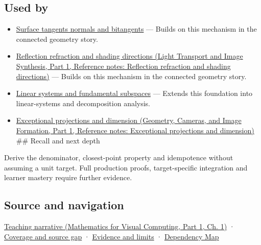 \subsection{Used by}\label{appendix-505a502c372a-used-by}

\hypertarget{appendix-505a502c372a-used-by}{}

\begin{itemize}
\item
  \hyperref[appendix-e31893dec985]{Surface tangents normals and bitangents} --- Builds on this mechanism in the connected geometry story.
\item
  \href{../04-Light-Transport-and-Image-Synthesis-P01/main.pdf\#nameddest=appendix-44e00863b4d5}{Reflection refraction and shading directions (Light Transport and Image Synthesis, Part 1, Reference notes: Reflection refraction and shading directions)} --- Builds on this mechanism in the connected geometry story.
\item
  \hyperref[appendix-8572a4a060c1]{Linear systems and fundamental subspaces} --- Extends this foundation into linear-systems and decomposition analysis.
\item
  \href{../03-Geometry-Cameras-and-Image-Formation-P01/main.pdf\#nameddest=appendix-3c73f7862157}{Exceptional projections and dimension (Geometry, Cameras, and Image Formation, Part 1, Reference notes: Exceptional projections and dimension)} \#\# Recall and next depth
\end{itemize}

Derive the denominator, closest-point property and idempotence without assuming a unit target. Full production proofs, target-specific integration and learner mastery require further evidence.

\subsection{Source and navigation}\label{appendix-505a502c372a-source-and-navigation}

\hypertarget{appendix-505a502c372a-source-and-navigation}{}

\href{../02-Mathematics-for-Visual-Computing-P01/main.pdf\#nameddest=01-foundations-i-ch017-projection-separates-useful-movement-from-sideways-movement}{Teaching narrative (Mathematics for Visual Computing, Part 1, Ch. 1)} · \hyperref[appendix-fd090d982a15-phase-6---parts-501-600]{Coverage and source gap} · \hyperref[appendix-a103e7846d21-phase-6---source-analysis-and-verification]{Evidence and limits} · \hyperref[appendix-4ad47bdd269a]{Dependency Map}
